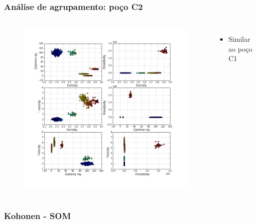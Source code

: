 \documentclass[aspectratio=10]{beamer} %
\begin{document}
\begin{frame}
	\frametitle{Análise de agrupamento: poço C2}
	
	\begin{columns}
		\footnotesize
		\justifying
		\begin{figure}
			\includegraphics[scale=0.268]{Imagens/cluterpocoC2.png}
		\end{figure}
		
		\begin{itemize}
			\footnotesize
			\item Similar ao poço C1
		\end{itemize}
		
	\end{columns}
\end{frame}

\subsubsection{Kohonen - SOM}
\end{document}
